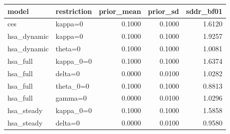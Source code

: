 \begin{tabular}{llrrr}
\toprule
model & restriction & prior\_mean & prior\_sd & sddr\_bf01 \\
\midrule
ces & kappa=0 & 0.1000 & 0.1000 & 1.6120 \\
hsa\_dynamic & kappa=0 & 0.1000 & 0.1000 & 1.9257 \\
hsa\_dynamic & theta=0 & 0.1000 & 0.1000 & 1.0081 \\
hsa\_full & kappa\_0=0 & 0.1000 & 0.1000 & 1.6374 \\
hsa\_full & delta=0 & 0.0000 & 0.0100 & 1.0282 \\
hsa\_full & theta\_0=0 & 0.1000 & 0.1000 & 0.8813 \\
hsa\_full & gamma=0 & 0.0000 & 0.0100 & 1.0296 \\
hsa\_steady & kappa\_0=0 & 0.1000 & 0.1000 & 1.5858 \\
hsa\_steady & delta=0 & 0.0000 & 0.0100 & 0.9580 \\
\bottomrule
\end{tabular}
